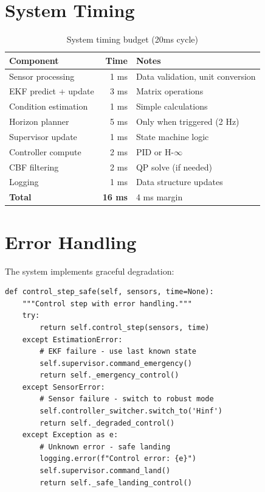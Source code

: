 \section{System Timing}

\begin{table}[htbp]
    \centering
    \caption{System timing budget (20ms cycle)}
    \label{tab:timing_budget}
    \begin{tabular}{@{}lrl@{}}
        \toprule
        \textbf{Component} & \textbf{Time} & \textbf{Notes} \\
        \midrule
        Sensor processing & 1 ms & Data validation, unit conversion \\
        EKF predict + update & 3 ms & Matrix operations \\
        Condition estimation & 1 ms & Simple calculations \\
        Horizon planner & 5 ms & Only when triggered (2 Hz) \\
        Supervisor update & 1 ms & State machine logic \\
        Controller compute & 2 ms & PID or H-$\infty$ \\
        CBF filtering & 2 ms & QP solve (if needed) \\
        Logging & 1 ms & Data structure updates \\
        \midrule
        \textbf{Total} & \textbf{16 ms} & 4 ms margin \\
        \bottomrule
    \end{tabular}
\end{table}

\section{Error Handling}

The system implements graceful degradation:

\begin{lstlisting}[caption={Error handling strategy}]
def control_step_safe(self, sensors, time=None):
    """Control step with error handling."""
    try:
        return self.control_step(sensors, time)
    except EstimationError:
        # EKF failure - use last known state
        self.supervisor.command_emergency()
        return self._emergency_control()
    except SensorError:
        # Sensor failure - switch to robust mode
        self.controller_switcher.switch_to('Hinf')
        return self._degraded_control()
    except Exception as e:
        # Unknown error - safe landing
        logging.error(f"Control error: {e}")
        self.supervisor.command_land()
        return self._safe_landing_control()
\end{lstlisting}

